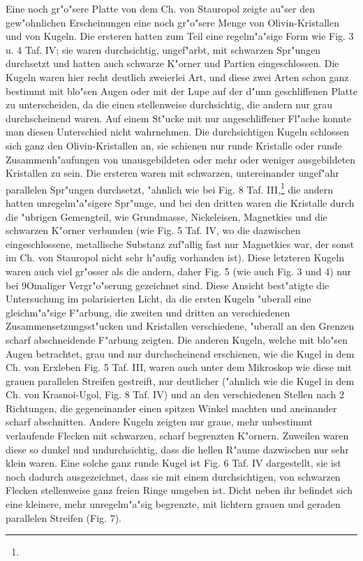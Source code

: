 \documentclass[a4paper, 11pt, oneside]{article}
\begin{document}
Eine noch gr"o"sere Platte von dem Ch. von Stauropol zeigte au"ser den gew"ohnlichen Erscheinungen eine noch gr"o"sere Menge von Olivin-Kristallen und von Kugeln. Die ersteren hatten zum Teil eine regelm"a"sige Form wie Fig. 3 u. 4 Taf. IV; sie waren durchsichtig, ungef"arbt, mit schwarzen Spr"ungen durchsetzt und hatten auch schwarze K"orner und Partien eingeschlossen. Die Kugeln waren hier recht deutlich zweierlei Art, und diese zwei Arten schon ganz bestimmt mit blo"sen Augen oder mit der Lupe auf der d"unn geschliffenen Platte zu unterscheiden, da die einen stellenweise durchsichtig, die andern nur grau durchscheinend waren. Auf einem St"ucke mit nur angeschliffener Fl"ache konnte man diesen Unterschied nicht wahrnehmen. Die durchsichtigen Kugeln schlossen sich ganz den Olivin-Kristallen an, sie schienen nur runde Kristalle oder runde Zusammenh"aufungen von unausgebildeten oder mehr oder weniger ausgebildeten Kristallen zu sein. Die ersteren waren mit schwarzen, untereinander ungef"ahr parallelen Spr"ungen durchsetzt, "ahnlich wie bei Fig. 8 Taf. III,\footnote{} die andern hatten unregelm"a"sigere Spr"unge, und bei den dritten waren die Kristalle durch die "ubrigen Gemengteil, wie Grundmasse, Nickeleisen, Magnetkies und die schwarzen K"orner verbunden (wie Fig. 5 Taf. IV, wo die dazwischen eingeschlossene, metallische Substanz zuf"allig fast nur Magnetkies war, der sonst im Ch. von Stauropol nicht sehr h"aufig vorhanden ist). Diese letzteren Kugeln waren auch viel gr"osser als die andern, daher Fig. 5 (wie auch Fig. 3 und 4) nur bei 9Omaliger Vergr"o"serung gezeichnet sind. Diese Ansicht best"atigte die Untersuchung im polarisierten Licht, da die ersten Kugeln "uberall eine gleichm"a"sige F"arbung, die zweiten und dritten an verschiedenen Zusammensetzungsst"ucken und Kristallen verschiedene, "uberall an den Grenzen scharf abschneidende F"arbung zeigten. Die anderen Kugeln, welche mit blo"sen Augen betrachtet, grau und nur durchscheinend erschienen, wie die Kugel in dem Ch. von Erxleben Fig. 5 Taf. III, waren auch unter dem Mikroskop wie diese mit grauen parallelen Streifen gestreift, nur deutlicher ("ahnlich wie die Kugel in dem Ch. von Krasnoi-Ugol, Fig. 8 Taf. IV) und an den verschiedenen Stellen nach 2 Richtungen, die gegeneinander einen spitzen Winkel machten und aneinander scharf abschnitten. Andere Kugeln zeigten nur graue, mehr unbestimmt verlaufende Flecken mit schwarzen, scharf begrenzten K"ornern. Zuweilen waren diese so dunkel und undurchsichtig, dass die hellen R"aume dazwischen nur sehr klein waren. Eine solche ganz runde Kugel ist Fig. 6 Taf. IV dargestellt, sie ist noch dadurch ausgezeichnet, dass sie mit einem durchsichtigen, von schwarzen Flecken stellenweise ganz freien Ringe umgeben ist. Dicht neben ihr befindet sich eine kleinere, mehr unregelm"a"sig begrenzte, mit lichtern grauen und geraden parallelen Streifen (Fig. 7).
\end{document}
